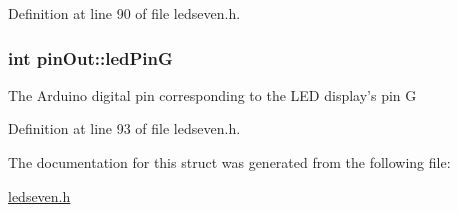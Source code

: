 Definition at line 90 of file ledseven.\+h.

\hypertarget{structpin_out_a34bb874b0fc3ef1cf5e6956a317d18ef}{
\subsubsection[{led\+Pin\+G}]{\setlength{\rightskip}{0pt plus 5cm}int pin\+Out\+::led\+Pin\+G}}\label{structpin_out_a34bb874b0fc3ef1cf5e6956a317d18ef}
The Arduino digital pin corresponding to the L\+E\+D display's pin G 

Definition at line 93 of file ledseven.\+h.



The documentation for this struct was generated from the following file\+:\begin{DoxyCompactItemize}
\item 
\hyperlink{ledseven_8h}{ledseven.\+h}\end{DoxyCompactItemize}
